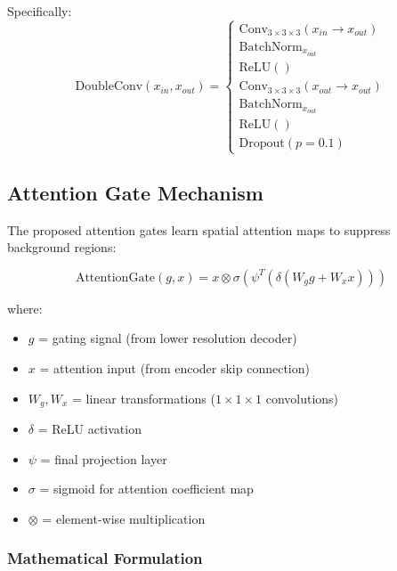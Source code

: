 \documentclass{ecsproject}     %
\begin{document}
Specifically:
\begin{equation}
\text{DoubleConv}(x_{in}, x_{out}) = \begin{cases}
\text{Conv}_{3\times3\times3}(x_{in} \rightarrow x_{out}) \\
\text{BatchNorm}_{x_{out}} \\
\text{ReLU}() \\
\text{Conv}_{3\times3\times3}(x_{out} \rightarrow x_{out}) \\
\text{BatchNorm}_{x_{out}} \\
\text{ReLU}() \\
\text{Dropout}(p=0.1)
\end{cases}
\end{equation}

\subsection{Attention Gate Mechanism}

The proposed attention gates learn spatial attention maps to suppress background regions:

\begin{equation}
\text{AttentionGate}(g, x) = x \otimes \sigma\left(\psi^T\left(\delta(W_g g + W_x x)\right)\right)
\end{equation}

where:
\begin{itemize}
    \item $g$ = gating signal (from lower resolution decoder)
    \item $x$ = attention input (from encoder skip connection)
    \item $W_g, W_x$ = linear transformations ($1\times1\times1$ convolutions)
    \item $\delta$ = ReLU activation
    \item $\psi$ = final projection layer
    \item $\sigma$ = sigmoid for attention coefficient map
    \item $\otimes$ = element-wise multiplication
\end{itemize}

\subsubsection{Mathematical Formulation}
\end{document}
